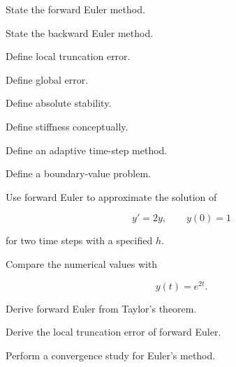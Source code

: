 \begin{exercise}[1]
State the forward Euler method.
\end{exercise}

\begin{exercise}[1]
State the backward Euler method.
\end{exercise}

\begin{exercise}[1]
Define local truncation error.
\end{exercise}

\begin{exercise}[1]
Define global error.
\end{exercise}

\begin{exercise}[1]
Define absolute stability.
\end{exercise}

\begin{exercise}[1]
Define stiffness conceptually.
\end{exercise}

\begin{exercise}[1]
Define an adaptive time-step method.
\end{exercise}

\begin{exercise}[1]
Define a boundary-value problem.
\end{exercise}

\begin{exercise}[2]
Use forward Euler to approximate the solution of

\[
y'=2y,
\qquad
y(0)=1
\]

for two time steps with a specified \(h\).
\end{exercise}

\begin{exercise}[2]
Compare the numerical values with

\[
y(t)=e^{2t}.
\]
\end{exercise}

\begin{exercise}[2]
Derive forward Euler from Taylor's theorem.
\end{exercise}

\begin{exercise}[3]
Derive the local truncation error of forward Euler.
\end{exercise}

\begin{exercise}[3]
Perform a convergence study for Euler's method.
\end{exercise}

